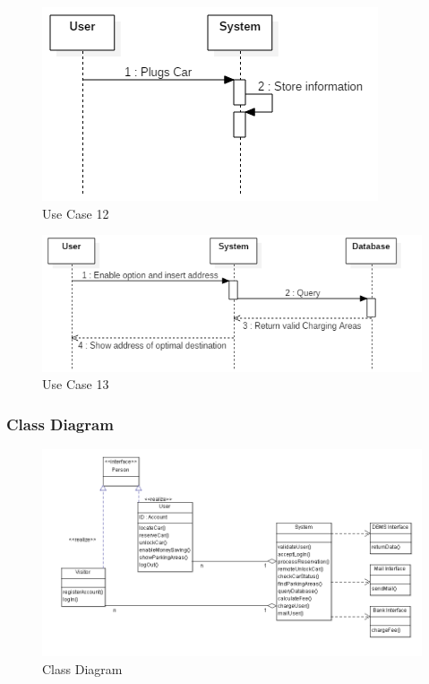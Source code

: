 \FloatBarrier
\begin{figure}[h]
\centering
\includegraphics[width=\linewidth,keepaspectratio]{../Diagrams/SD/UC_12.png}
\caption{Use Case 12}
\end{figure}
\FloatBarrier
\begin{figure}[h]
\centering
\includegraphics[width=\linewidth,keepaspectratio]{../Diagrams/SD/UC_13.png}
\caption{Use Case 13}
\end{figure}
\FloatBarrier

\clearpage
\subsubsection{Class Diagram}
\begin{figure}[h]
\centering
\includegraphics[width=\linewidth,keepaspectratio]{../Diagrams/CD/Class_Diagram.png}
\caption{Class Diagram}
\end{figure}
\FloatBarrier

